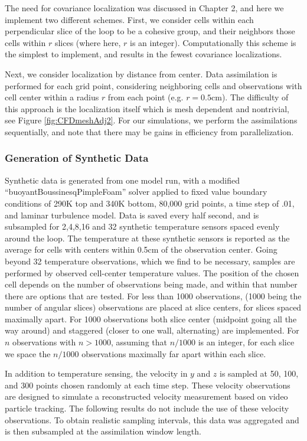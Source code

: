 \documentclass[12pt]{report}
\begin{document}
The need for covariance localization was discussed in Chapter 2, and here we implement two different schemes.
First, we consider cells within each perpendicular slice of the loop to be a cohesive group, and their neighbors those cells within $r$ slices (where here, $r$ is an integer).
Computationally this scheme is the simplest to implement, and results in the fewest covariance localizations.

Next, we consider localization by distance from center.
Data assimilation is performed for each grid point, considering neighboring cells and observations with cell center within a radius $r$ from each point (e.g. $r = 0.5$cm).
The difficulty of this approach is the localization itself which is mesh dependent and nontrivial, see Figure \ref{fig:CFDmeshAdj2}.
For our simulations, we perform the assimilations sequentially, and note that there may be gains in efficiency from parallelization.

\subsubsection{Generation of Synthetic Data}

Synthetic data is generated from one model run, with a modified ``buoyantBoussinesqPimpleFoam'' solver applied to fixed value boundary conditions of 290K top and 340K bottom, 80,000 grid points, a time step of .01, and laminar turbulence model.
Data is saved every half second, and is subsampled for 2,4,8,16 and 32 synthetic temperature sensors spaced evenly around the loop.
The temperature at these synthetic sensors is reported as the average for cells with centers within 0.5cm of the observation center.
Going beyond 32 temperature observations, which we find to be necessary, samples are performed by observed cell-center temperature values.
The position of the chosen cell depends on the number of observations being made, and within that number there are options that are tested.
For less than 1000 observations, (1000 being the number of angular slices) observations are placed at slice centers, for slices spaced maximally apart.
For 1000 observations both slice center (midpoint going all the way around) and staggered (closer to one wall, alternating) are implemented.
For $n$ observations with $n>1000$, assuming that $n/1000$ is an integer, for each slice we space the $n/1000$ observations maximally far apart within each slice.

In addition to temperature sensing, the velocity in $y$ and $z$ is sampled at 50, 100, and 300 points chosen randomly at each time step.
These velocity observations are designed to simulate a reconstructed velocity measurement based on video particle tracking.
The following results do not include the use of these velocity observations.
To obtain realistic sampling intervals, this data was aggregated and is then subsampled at the assimilation window length.
\end{document}
